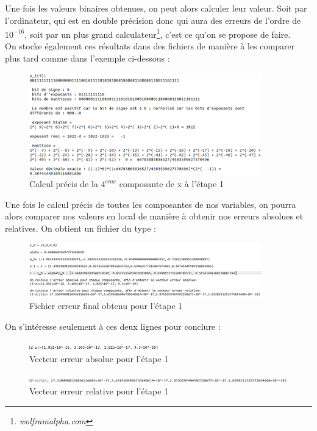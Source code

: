 \documentclass[12,french]{report}
\begin{document}
Une fois les valeurs binaires obtenues, on peut alors calculer leur valeur. Soit par l'ordinateur, qui est en double précision donc qui aura des erreurs de l'ordre de $10^{-16}$, soit par un plus grand calculateur\footnote{\textit{wolframalpha.com}}, c'est ce qu'on se propose de faire.\\

On stocke également ces résultats dans des fichiers de manière à les comparer plus tard comme dans l'exemple ci-dessous :

\begin{figure}[H]
	\center
	\includegraphics[width=0.9\textwidth]{./Images/x_1(4)}
	\caption{Calcul précis de la $4^{eme}$ composante de x à l'étape 1}
\end{figure}

Une fois le calcul précis de toutes les composantes de nos variables, on pourra alors comparer nos valeurs en local de manière à obtenir nos erreurs absolues et relatives. On obtient un fichier du type :

\begin{figure}[H]
	\center
	\includegraphics[width=0.9\textwidth]{./Images/err_x_1}
	\caption{Fichier erreur final obtenu pour l'étape 1}
\end{figure}

On s'intéresse seulement à ces deux lignes pour conclure :
\begin{figure}[H]
	\center
	\includegraphics[width=0.5\textwidth]{./Images/err_abs_x_1}
	\caption{Vecteur erreur absolue pour l'étape 1}
\end{figure}
\begin{figure}[H]
	\center
	\includegraphics[width=1\textwidth]{./Images/err_rel_x_1}
	\caption{Vecteur erreur relative pour l'étape 1}
\end{figure}
\end{document}
